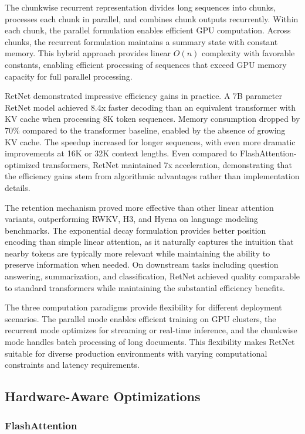 The chunkwise recurrent representation divides long sequences into chunks, processes each chunk in parallel, and combines chunk outputs recurrently. Within each chunk, the parallel formulation enables efficient GPU computation. Across chunks, the recurrent formulation maintains a summary state with constant memory. This hybrid approach provides linear $O(n)$ complexity with favorable constants, enabling efficient processing of sequences that exceed GPU memory capacity for full parallel processing.

RetNet demonstrated impressive efficiency gains in practice. A 7B parameter RetNet model achieved 8.4x faster decoding than an equivalent transformer with KV cache when processing 8K token sequences. Memory consumption dropped by 70\% compared to the transformer baseline, enabled by the absence of growing KV cache. The speedup increased for longer sequences, with even more dramatic improvements at 16K or 32K context lengths. Even compared to FlashAttention-optimized transformers, RetNet maintained 7x acceleration, demonstrating that the efficiency gains stem from algorithmic advantages rather than implementation details.

The retention mechanism proved more effective than other linear attention variants, outperforming RWKV, H3, and Hyena on language modeling benchmarks. The exponential decay formulation provides better position encoding than simple linear attention, as it naturally captures the intuition that nearby tokens are typically more relevant while maintaining the ability to preserve information when needed. On downstream tasks including question answering, summarization, and classification, RetNet achieved quality comparable to standard transformers while maintaining the substantial efficiency benefits.

The three computation paradigms provide flexibility for different deployment scenarios. The parallel mode enables efficient training on GPU clusters, the recurrent mode optimizes for streaming or real-time inference, and the chunkwise mode handles batch processing of long documents. This flexibility makes RetNet suitable for diverse production environments with varying computational constraints and latency requirements.

\subsection{Hardware-Aware Optimizations}

\subsubsection{FlashAttention}

